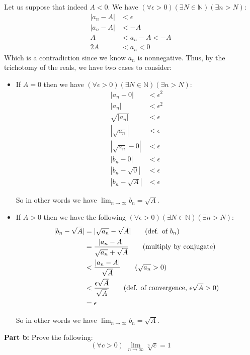 \documentclass{article}
\newcommand{\N}{\mathbb N}
\begin{document}
Let us suppose that indeed $A<0$. We have $(\forall \epsilon>0)(\exists N\in\N)(\exists n>N)$:
\begin{align*}
  |a_n-A|&<\epsilon\tag{def. of convergence}\\
  |a_n-A|&<-A\tag{$-A>0$}\\
  A&<a_n-A<-A\\
  2A&<a_n<0
\end{align*}
Which is a contradiction since we know $a_n$ is nonnegative. Thus, by the trichotomy of the reals, we have two cases to consider:
\begin{itemize}
  \item If $A=0$ then we have $(\forall \epsilon>0)(\exists N\in\N)(\exists n>N)$:
  \begin{align*}
    |a_n-0|&<\epsilon^2\tag{def. of convergence, $\epsilon^2>0$}\\
    |a_n|&<\epsilon^2\\
    \sqrt{|a_n|}&<\epsilon\tag{both sides of inequality are positive}\\
    {|\sqrt{a_n}|}&<\epsilon\tag{$a_n>0$}\\
    {|\sqrt{a_n}-0|}&<\epsilon\\
    {|b_n-0|}&<\epsilon\tag{def. of $b_n$}\\
    {|b_n-\sqrt{0}|}&<\epsilon\\
    {|b_n-\sqrt{A}|}&<\epsilon\tag{$A=0$ by assumption}
  \end{align*} 

  So in other words we have $\lim_{n\to\infty}b_n=\sqrt{A}$.

  \item  If $A>0$ then we have the following $(\forall \epsilon>0)(\exists N\in\N)(\exists n>N)$:
  \begin{align*}
    |b_n-\sqrt{A}|&=|\sqrt{a_n}-\sqrt{A}|\tag{def. of $b_n$}\\
    &=\frac{|a_n-A|}{\sqrt{a_n}+\sqrt{A}}\tag{multiply by conjugate}\\
    &<\frac{|a_n-A|}{\sqrt{A}}\tag{$\sqrt{a_n}>0$}\\
    &<\frac{\epsilon\sqrt{A}}{\sqrt{A}}\tag{def. of convergence, $\epsilon\sqrt{A}>0$}\\
    &=\epsilon
  \end{align*}

  So in other words we have $\lim_{n\to\infty}b_n=\sqrt{A}$.
\end{itemize}
\bigskip

\noindent\textbf{Part b:} Prove the following:
$$(\forall c>0)\,\,\lim_{n\to\infty}\sqrt[n]{c}=1$$
\end{document}
